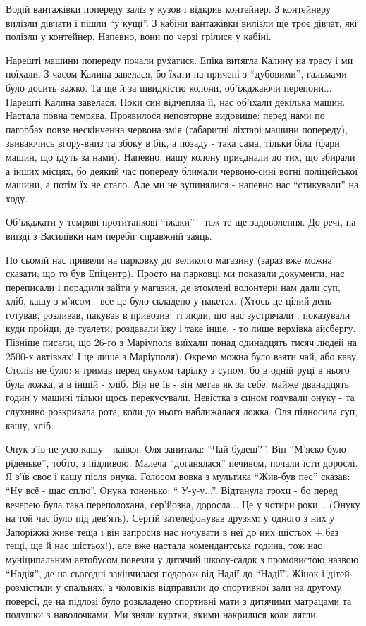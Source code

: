 Водій вантажівки попереду заліз у кузов і відкрив контейнер. З контейнеру
вилізли дівчати і пішли \enquote{у кущі}. З кабіни вантажівки вилізли ще троє дівчат,
які полізли у контейнер. Напевно, вони по черзі грілися у кабіні.

Нарешті машини попереду почали рухатися. Епіка витягла Калину на трасу і ми
поїхали. З часом Калина завелася, бо їхати на причепі з \enquote{дубовими}, гальмами
було досить важко. Та ще й за швидкістю колони, об'їжджаючи перепони... Нарешті
Калина завелася. Поки син відчепляа  її, нас об'їхали декілька машин. Настала
повна темрява. Проявилося неповторне видовище: перед нами по пагорбах повзе
нескінченна червона змія (габаритні ліхтарі машини попереду), звиваючись
вгору-вниз та збоку в бік, а позаду - така сама, тільки біла (фари машин, що
їдуть за нами). Напевно, нашу колону приєднали до тих, що збирали а інших
місцях, бо деякий час попереду блимали червоно-сині вогні поліцейської машини,
а потім їх не стало. Але ми не зупинялися - напевно нас \enquote{стикували} на ходу.

Об'їжджати у темряві протитанкові \enquote{їжаки} - теж те ще задоволення. До речі, на
виїзді з Василівки нам перебіг справжній заяць.

По сьомій нас привели на парковку до великого магазину (зараз вже можна
сказати, що то був Епіцентр). Просто на парковці ми показали документи, нас
переписали і порадили зайти у магазин, де втомлені волонтери нам дали суп,
хліб, кашу з м'ясом - все це було складено у пакетах. (Хтось це цілий день
готував, розливав, пакував в привозив: ті люди, що нас зустрвчали , показували
куди пройди, де туалети, роздавали їжу і таке інше, - то лише верхівка
айсбергу. Пізніше писали, що 26-го з Маріуполя виїхали понад одинадцять тисяч
людей на 2500-х автівках! І це лише з Маріуполя).  Окремо можна було взяти чай,
або каву. Столів не було: я тримав перед онуком тарілку з супом, бо в одній
руці в нього була ложка, а в іншій - хліб. Він не їв - він метав як за себе:
майже дванадцять годин у машині тільки щось перекусували. Невістка з сином
годували онуку - та слухняно розкривала рота, коли до нього наближалася ложка.
Оля підносила суп, кашу, хліб.

Онук з'їв не усю кашу - наївся. Оля запитала: \enquote{Чай будеш?}. Він \enquote{М'яско було
ріденьке}, тобто,  з підливою. Малеча \enquote{доганялася} печивом, почали їсти
дорослі. Я з'їв своє і кашу після онука. Голосом вовка з мультика \enquote{Жив-був пес}
сказав: \enquote{Ну всё - щас сплю}. Онука тоненько: \enquote{ У-у-у...}. Відтанула трохи - бо
перед вечерею  була така переполохана, сер'йозна, доросла... Це у чотири
роки... (Онуку на той час було під дев'ять). Сергій зателефонував друзям: у
одного з них у Запоріжжі живе теща і він запросив нас ночувати в неї до них
шістьох +,без тещі, ще й нас шістьох!), але вже настала комендантська година,
тож нас муніципальним автобусом повезли у дитячий школу-садок з промовистою
назвою \enquote{Надія}, де на сьогодні закінчилася подорож від Надії до \enquote{Надії}. Жінок
і дітей розмістили у спальнях, а чоловіків відправили до спортивної зали на
другому поверсі, де на підлозі було розкладено спортивні мати з дитячими
матрацами та подушки з наволочками. Ми зняли куртки, якими накрилися коли
лягли.

